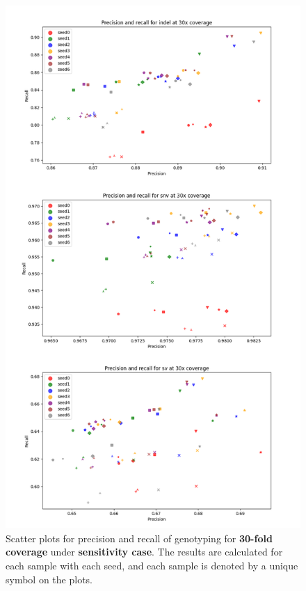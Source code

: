 \documentclass{PHlab-thesis}
\begin{document}
\begin{figure}[ht!]
	\centering
	\includegraphics[scale=0.5]{figures/Sensitivity_genotyping_30x.png}
	\caption{Scatter plots for precision and recall of genotyping for \textbf{30-fold coverage} under \textbf{sensitivity case}. The results are calculated for each sample with each seed, and each sample is denoted by a unique symbol on the plots.}
	\label{fig:sensitivity_genotyping_30x} %
\end{figure}
\end{document}
